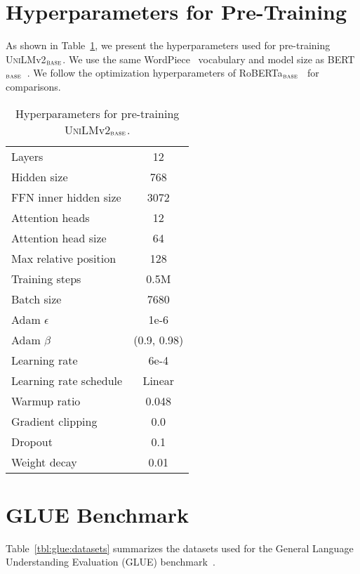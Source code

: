 \documentclass{article}
\newcommand{\bertbase}{BERT$_{\textsc{base}}$}
\newcommand{\robertabase}{RoBERTa$_{\textsc{base}}$}
\newcommand{\vtwobase}{\textsc{UniLM}v2$_{\textsc{base}}$}
\begin{document}



\clearpage
\appendix

\section{Hyperparameters for Pre-Training}

As shown in Table~\ref{tbl:pretraining_hyperparams}, we present the hyperparameters used for pre-training \vtwobase{}.
We use the same WordPiece~\cite{gnmt} vocabulary and model size as \bertbase{}~\cite{bert}.
We follow the optimization hyperparameters of \robertabase{}~\cite{roberta} for comparisons.


\begin{table}[h]
\centering
\begin{tabular}{lc}
\toprule
Layers & 12 \\
Hidden size & 768 \\
FFN inner hidden size & 3072 \\
Attention heads & 12 \\
Attention head size & 64 \\
Max relative position & 128 \\
Training steps & 0.5M \\
Batch size & 7680 \\
Adam $\epsilon$ & 1e-6 \\
Adam $\beta$ & (0.9, 0.98) \\
Learning rate & 6e-4 \\
Learning rate schedule & Linear \\
Warmup ratio & 0.048 \\
Gradient clipping & 0.0 \\
Dropout & 0.1 \\
Weight decay & 0.01 \\
\bottomrule
\end{tabular}
\caption{
Hyperparameters for pre-training \vtwobase{}.
}
\label{tbl:pretraining_hyperparams}
\end{table}


\section{GLUE Benchmark}


Table~\ref{tbl:glue:datasets} summarizes the datasets used for the General Language Understanding Evaluation (GLUE) benchmark~\cite{wang2018glue}.
\end{document}

